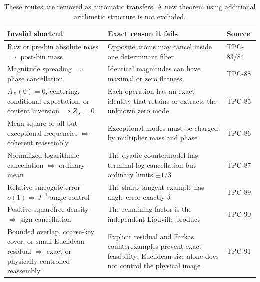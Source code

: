 \begin{table}[H]
\centering
\small
\begin{tabularx}{\textwidth}{@{}
  >{\raggedright\arraybackslash}p{}
  >{\raggedright\arraybackslash}X
  >{\raggedright\arraybackslash}p{}@{}}
\toprule
Invalid shortcut & Exact reason it fails & Source\\
\midrule
Raw or pre-bin absolute mass \(\Rightarrow\) post-bin mass
&
Opposite atoms may cancel inside one determinant fiber
&
TPC-83/84
\\
\addlinespace
Magnitude spreading \(\Rightarrow\) phase cancellation
&
Identical magnitudes can have maximal or zero flatness
&
TPC-88
\\
\addlinespace
\(A_X(0)=0\), centering, conditional expectation, or content
inversion \(\Rightarrow Z_X=0\)
&
Each operation has an exact identity that retains or extracts the
unknown zero mode
&
TPC-85
\\
\addlinespace
Mean-square or all-but-exceptional frequencies \(\Rightarrow\)
coherent reassembly
&
Exceptional modes must be charged by multiplier mass and phase
&
TPC-86
\\
\addlinespace
Normalized logarithmic cancellation \(\Rightarrow\) ordinary mean
&
The dyadic countermodel has terminal log cancellation but ordinary
limits \(\pm1/3\)
&
TPC-87
\\
\addlinespace
Relative surrogate error \(o(1)\Rightarrow J^{-1}\) angle control
&
The sharp tangent example has angle error exactly \(\delta\)
&
TPC-89
\\
\addlinespace
Positive squarefree density \(\Rightarrow\) sign cancellation
&
The remaining factor is the independent Liouville product
&
TPC-90
\\
\addlinespace
Bounded overlap, coarse-key cover, or small Euclidean residual
\(\Rightarrow\) exact or physically controlled reassembly
&
Explicit residual and Farkas counterexamples prevent exact
feasibility; Euclidean size alone does not control the physical image
&
TPC-91
\\
\bottomrule
\end{tabularx}
\caption{These routes are removed as automatic transfers.  A new
theorem using additional arithmetic structure is not excluded.}
\label{tab:killed-shortcuts}
\end{table}
